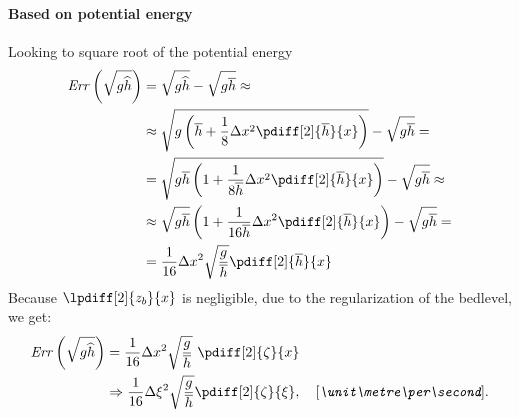 \paragraph*{Based on potential energy}
Looking to square root of the potential energy
\begin{align}
    {\it Err}\left(\sqrt{g\hhat}\right) & = \sqrt{g\hhat} - \sqrt{g\hbar} \approx
    \\
    & \approx \sqrt{g\left(\hbar + \frac{1}{8}\Dx^2\pdiff[2]{\hbar}{x}\right)} - \sqrt{g\hbar} =
    \\
    & = \sqrt{g\hbar\left(1 + \frac{1}{8\hbar}\Dx^2\pdiff[2]{\hbar}{x}\right)} - \sqrt{g\hbar} \approx
    \\
    &\approx \sqrt{g\hbar}\left(1 + \frac{1}{16\hbar}\Dx^2 \pdiff[2]{\hbar}{x}\right) - \sqrt{g\hbar} =
    \\
    & = \frac{1}{16} \Dx^2 \sqrt{\frac{g}{\hbar}}\pdiff[2]{\hbar}{x}
\end{align}
Because $\lpdiff[2]{z_b}{x}$ is negligible, due to the regularization of the bedlevel, we get:
\begin{align}
    {\it Err}\left(\sqrt{g\hhat}\right)  & = \frac{1}{16} \Dx^2 \sqrt{\frac{g}{\hbar}}\ \pdiff[2]{\zeta}{x}
    \\
    & \Rightarrow \frac{1}{16} \Dxi^2 \sqrt{\frac{g}{\hbar}}\pdiff[2]{\zeta}{\xi}, \quad \bunit{\metre\per\second}.
\end{align}
\phantom{text}
%
